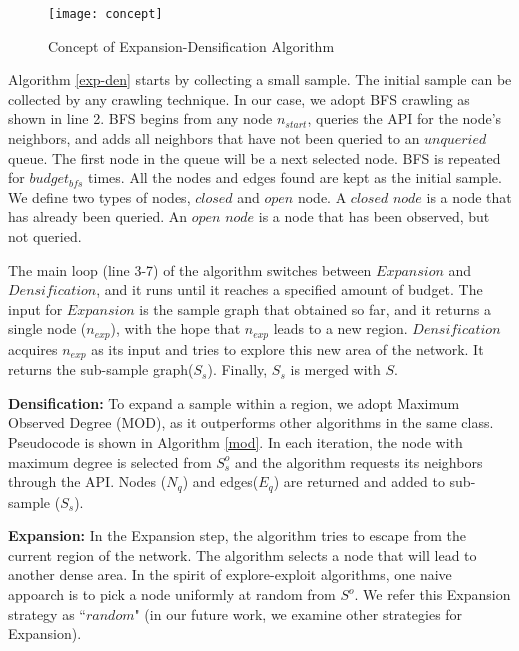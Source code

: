 \newcommand*{\captionsource}[2]{%
  \caption[{#1}]{%
    #1%
    \\\hspace{\linewidth}%
    (source: #2)%
  }%
}

\begin{figure}[h]
    \centering
    \texttt{[image: concept]}
    \caption{Concept of Expansion-Densification Algorithm}
    \label{fig:example}
\end{figure}

Algorithm \ref{exp-den} starts by collecting a small sample. The initial sample can be collected by any crawling technique. In our case, we adopt BFS crawling as shown in line 2.  BFS begins from any node $n_{start}$, queries the API for the node's neighbors, and adds all neighbors that have not been queried to an $\textit{unqueried}$ queue. The first node in the queue will be a next selected node. BFS is repeated for $budget_{bfs}$ times. All the nodes and edges found are kept as the initial sample. We define two types of nodes, $\textit{closed}$ and $\textit{open}$ node. A
$\textit{closed node}$ is a node that has already been queried. An $\textit{open node}$ is a node that has been observed, but not queried.

The main loop (line 3-7) of the algorithm switches between $Expansion$ and $Densification$, and it runs until it reaches a specified amount of budget. The input for $Expansion$ is the sample graph that obtained so far, and it returns a single node ($n_{exp}$), with the hope that $n_{exp}$ leads to a new region. $Densification$ acquires $n_{exp}$ as its input and tries to explore this new area of the network. It returns the sub-sample graph($S_{s}$). Finally, $S_{s}$ is merged with $S$.



\textbf{Densification: }
To expand a sample within a region, we adopt Maximum Observed Degree (MOD)\cite{avrachenkov2014pay}, as it outperforms other algorithms in the same class. Pseudocode is shown in Algorithm \ref{mod}. In each iteration, the node with maximum degree is selected from $S_{s}^{o}$ and the algorithm requests its neighbors through the API. Nodes ($N_{q}$) and edges($E_{q}$) are returned and added to sub-sample ($S_{s}$). 

\textbf{Expansion: } In the Expansion step, the algorithm tries to escape from the current region of the network. The algorithm selects a node that will lead to another dense area. In the spirit of explore-exploit algorithms, one naive appoarch is to pick a node uniformly at random from $S^{o}$.  We refer this Expansion strategy as ``$random$" (in our future work, we examine other strategies for Expansion). 


